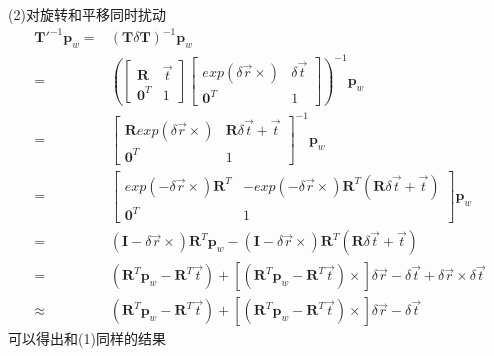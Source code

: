 \documentclass{article}
\begin{document}
(2)对旋转和平移同时扰动
\begin{equation}
	\begin{aligned}
		\boldsymbol{T}'^{-1}\boldsymbol{p}_w = & (\boldsymbol{T}\delta\boldsymbol{T})^{-1}\boldsymbol{p}_w \\ =& 
		\left(
		\left[ 
		\begin{matrix}
		\boldsymbol{R} & \vec{t}\\
		\boldsymbol{0}^T & 1
		\end{matrix}
		\right]
		\left[
		\begin{matrix}
		exp(\delta\vec{r}\times) & \delta\vec{t} \\
		\boldsymbol{0}^T & 1
		\end{matrix}
		\right]
		\right)^{-1} \boldsymbol{p}_w
		\\=&
		\left[
		\begin{matrix}
		\boldsymbol{R}exp(\delta\vec{r}\times) & \boldsymbol{R}\delta\vec{t}+\vec{t} \\
		\boldsymbol{0}^T & 1
		\end{matrix}
		\right]^{-1} \boldsymbol{p}_w
		\\=& 
		\left[
		\begin{matrix}
		exp(-\delta\vec{r}\times)\boldsymbol{R}^T & -exp(-\delta\vec{r}\times)\boldsymbol{R}^T(\boldsymbol{R}\delta\vec{t}+\vec{t}) \\
		\boldsymbol{0}^T & 1
		\end{matrix}
		\right] \boldsymbol{p}_w \\=& 
		(\boldsymbol{I}-\delta\vec{r}\times)\boldsymbol{R}^T\boldsymbol{p}_w-(\boldsymbol{I}-\delta\vec{r}\times)\boldsymbol{R}^T(\boldsymbol{R}\delta\vec{t}+\vec{t}) \\=&
		(\boldsymbol{R}^T\boldsymbol{p}_w-\boldsymbol{R}^T\vec{t})+[(\boldsymbol{R}^T\boldsymbol{p}_w-\boldsymbol{R}^T\vec{t})\times]\delta\vec{r}-\delta\vec{t}+\delta\vec{r}\times\delta\vec{t} \\\approx &
		(\boldsymbol{R}^T\boldsymbol{p}_w-\boldsymbol{R}^T\vec{t})+[(\boldsymbol{R}^T\boldsymbol{p}_w-\boldsymbol{R}^T\vec{t})\times]\delta\vec{r}-\delta\vec{t}
	\end{aligned}
\end{equation}
可以得出和(1)同样的结果
\end{document}
